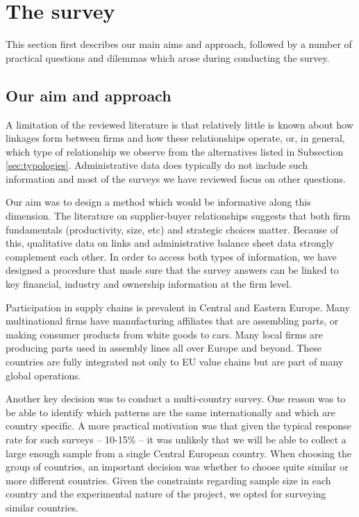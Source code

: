 \documentclass[final, dvipsnames, authoryear,12pt]{elsarticle}
\begin{document}
\section{The survey}
\label{sec:survey}

This section first describes our main aims and approach, followed by a number of practical questions and dilemmas which arose during conducting the survey.

  
\subsection{Our aim and approach}

A limitation of the reviewed literature is that relatively little is known about how linkages form between firms and how these relationships operate, or, in general, which type of relationship we observe from the alternatives listed in Subsection \ref{sec:typologies}. Administrative data does typically do not include such information and most of the surveys we have reviewed focus on other questions.

Our aim was to design a method which would be informative along this dimension. The literature on supplier-buyer relationships suggests that both firm fundamentals (productivity, size, etc) and strategic choices matter. Because of this, qualitative data on links and administrative balance sheet data strongly complement each other. In order to access both types of information, we have designed a procedure that made sure that the survey answers can be linked to key financial, industry and ownership information at the firm level.

Participation in supply chains is prevalent in Central and Eastern Europe. Many multinational firms have manufacturing affiliates that are assembling parts, or making consumer products from white goods to cars. Many local firms are producing parts used in assembly lines all over Europe and beyond. These countries are fully integrated not only to EU value chains but are part of many global operations. 

Another key decision was to conduct a multi-country survey. One reason was to be able to identify which patterns are the same internationally and which are country specific. A more practical motivation was that given the typical response rate for such surveys -- 10-15\% -- it was unlikely that we will be able to collect a large enough sample from a single Central European country. When choosing the group of countries, an important decision was whether to choose quite similar or more different countries. Given the constraints regarding sample size in each country and the experimental nature of the project, we opted for surveying similar countries.
\end{document}
